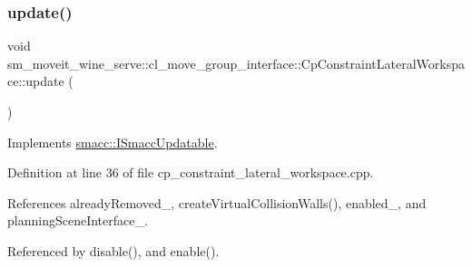 \subsubsection{\texorpdfstring{update()}{update()}}
{\footnotesize\ttfamily void sm\+\_\+moveit\+\_\+wine\+\_\+serve\+::cl\+\_\+move\+\_\+group\+\_\+interface\+::\+Cp\+Constraint\+Lateral\+Workspace\+::update (\begin{DoxyParamCaption}{ }\end{DoxyParamCaption})\hspace{0.3cm}{\ttfamily [virtual]}}



Implements \hyperlink{classsmacc_1_1ISmaccUpdatable_a84ee0520cbefdb1d412bed54650b028e}{smacc\+::\+I\+Smacc\+Updatable}.



Definition at line 36 of file cp\+\_\+constraint\+\_\+lateral\+\_\+workspace.\+cpp.



References already\+Removed\+\_\+, create\+Virtual\+Collision\+Walls(), enabled\+\_\+, and planning\+Scene\+Interface\+\_\+.



Referenced by disable(), and enable().


